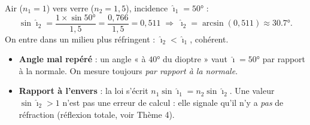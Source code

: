 \documentclass[11pt,a4paper]{article}
\begin{document}
\begin{exemplebox}
Air ($n_1=1$) vers verre ($n_2=1{,}5$), incidence $\hat{\imath}_1=\ang{50}$ :
\[ \sin\hat{\imath}_2=\frac{1\times\sin\ang{50}}{1{,}5}=\frac{0{,}766}{1{,}5}=0{,}511
   \;\Rightarrow\;\hat{\imath}_2=\arcsin(0{,}511)\approx\ang{30.7}. \]
On entre dans un milieu plus réfringent : $\hat{\imath}_2<\hat{\imath}_1$, cohérent.
\end{exemplebox}

\begin{piege}
\begin{itemize}[leftmargin=1.4em,topsep=2pt,itemsep=1pt]
  \item \textbf{Angle mal repéré} : un angle « à $\ang{40}$ du dioptre » vaut $\hat{\imath}=\ang{50}$
        par rapport à la normale. On mesure toujours \emph{par rapport à la normale}.
  \item \textbf{Rapport à l'envers} : la loi s'écrit $n_1\sin\hat{\imath}_1=n_2\sin\hat{\imath}_2$.
        Une valeur $\sin\hat{\imath}_2>1$ n'est pas une erreur de calcul : elle signale qu'il n'y a
        \emph{pas} de réfraction (réflexion totale, voir Thème 4).
\end{itemize}
\end{piege}
\end{document}
